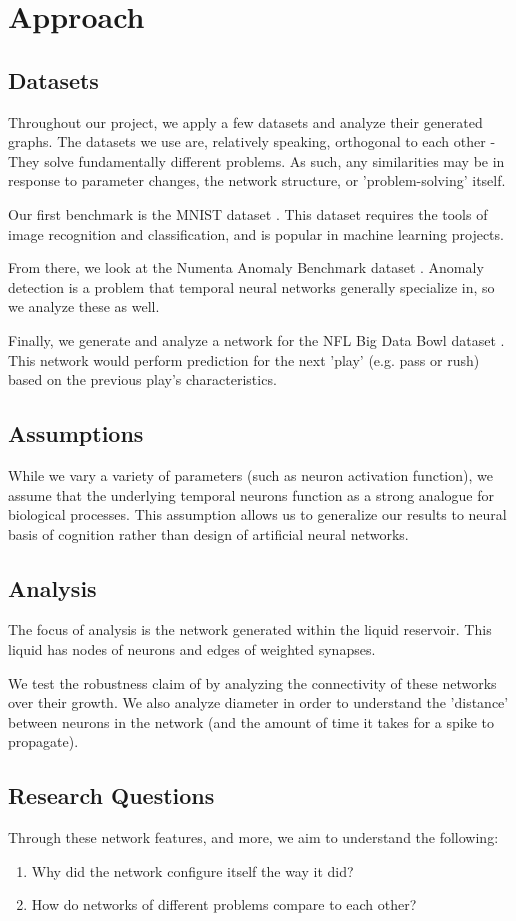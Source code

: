 \section{Approach} \label{sec:Approach}

\subsection{Datasets}

Throughout our project, we apply a few datasets and analyze their generated
graphs. The datasets we use are, relatively speaking, orthogonal to each other -
They solve fundamentally different problems. As such, any similarities may be in
response to parameter changes, the network structure, or 'problem-solving'
itself.

Our first benchmark is the MNIST dataset \cite{MNIST Dataset}. This dataset
requires the tools of image recognition and classification, and is popular in
machine learning projects.

From there, we look at the Numenta Anomaly Benchmark dataset \cite{NAB Dataset}.
Anomaly detection is a problem that temporal neural networks generally
specialize in, so we analyze these as well.

Finally, we generate and analyze a network for the NFL Big Data Bowl dataset
\cite{NFL Dataset}. This network would perform prediction for the next 'play'
(e.g. pass or rush) based on the previous play's characteristics.

\subsection{Assumptions}

While we vary a variety of parameters (such as neuron activation function), we
assume that the underlying temporal neurons function as a strong analogue for
biological processes. This assumption allows us to generalize our results to
neural basis of cognition rather than design of artificial neural networks.

\subsection{Analysis}

The focus of analysis is the network generated within the liquid reservoir. This
liquid has nodes of neurons and edges of weighted synapses.

We test the robustness claim of \cite{LSM Constraints} by analyzing the
connectivity of these networks over their growth. We also analyze diameter in
order to understand the 'distance' between neurons in the network (and the
amount of time it takes for a spike to propagate).

\subsection{Research Questions}

Through these network features, and more, we aim to understand the following:

\begin{enumerate}
    \item Why did the network configure itself the way it did?
    \item How do networks of different problems compare to each other?
\end{enumerate}